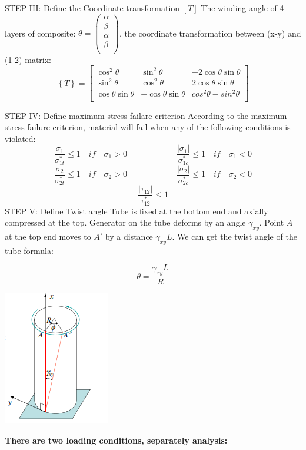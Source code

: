 \documentclass[12pt]{article}
\begin{document}
\noindent STEP III: Define the Coordinate transformation $\left[ T \right]$
\noindent The winding angle of 4 layers of composite: $ \theta = \left( \begin{matrix}
	\alpha  \\
	\beta  \\
	\alpha  \\
	\beta	\\
	\end{matrix} \right)$, the coordinate transformation between (x-y) and (1-2) matrix:$$ \left\{ T \right\} = \left[\begin{matrix}
			\cos^2{\theta} & \sin^2{\theta} & -2\cos{\theta}\sin{\theta} \\
			\sin^2{\theta} & \cos^2{\theta} & 2\cos{\theta}\sin{\theta} \\
			\cos{\theta}\sin{\theta} & -\cos{\theta}\sin{\theta} & cos^2{\theta}-sin^2{\theta} \\
			\end{matrix} \right]$$\newline

\noindent STEP IV: Define maximum stress failare criterion\newline
According to the maximum stress failure criterion, material will fail when any of the following conditions is violated:\newline
$$\frac{\sigma_1}{\sigma^*_{1t}} \leq 1 \quad if \quad \sigma_1 > 0 \qquad\qquad\qquad \frac{\left| \sigma_1 \right|}{\sigma^*_{1c}} \leq 1 \quad if \quad  \sigma_1 < 0$$
$$\frac{\sigma_2}{\sigma^*_{2t}} \leq 1 \quad if \quad \sigma_2 > 0 \qquad\qquad\qquad \frac{\left| \sigma_2 \right|}{\sigma^*_{2c}} \leq 1 \quad if \quad  \sigma_2 < 0$$
$$\frac{\left| \tau_{12} \right|}{\tau^*_{12}} \leq 1$$\newline\newline
\noindent STEP V: Define Twist angle
Tube is fixed at the bottom end and axially compressed at the top.
Generator on the tube deforms by an angle $\gamma_{xy}$.
Point $A$ at the top end moves to $A′$ by a distance $\gamma_{xy}L$.
We can get the twist angle of the tube formula:\newline
\begin{minipage}[b]{0.7\linewidth}
	$$\theta = \frac{\gamma_{xy}L}{R}$$\newline\newline
	\end{minipage}
	\hfill
	\begin{minipage}[b]{0.3\linewidth}
		\includegraphics{twist.png}
	\end{minipage}
\noindent\textbf{There are two loading conditions, separately analysis:}
\end{document}
